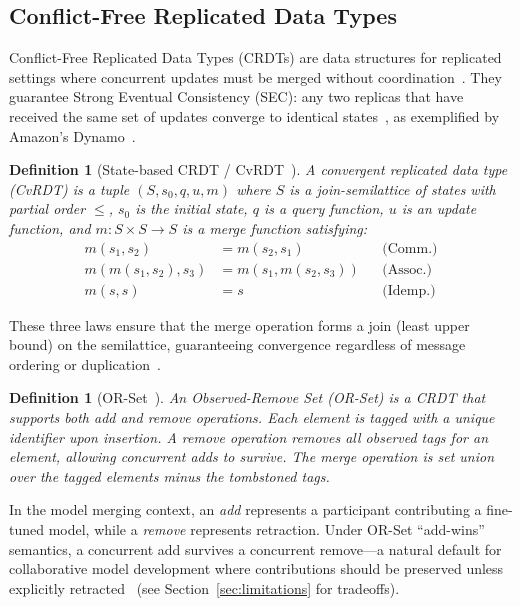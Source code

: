 \documentclass[10pt,letterpaper]{article}
\newtheorem{definition}[theorem]{Definition}
\begin{document}
\subsection{Conflict-Free Replicated Data Types}\label{sec:crdt_bg}

Conflict-Free Replicated Data Types (CRDTs) are data structures for replicated settings where concurrent updates must be merged without coordination~\cite{shapiro2011conflict,shapiro2011comprehensive}.
They guarantee Strong Eventual Consistency (SEC): any two replicas that have received the same set of updates converge to identical states~\cite{vogels2009eventually}, as exemplified by Amazon's Dynamo~\cite{decandia2007dynamo}.

\begin{definition}[State-based CRDT / CvRDT~\cite{shapiro2011conflict}]
A convergent replicated data type (CvRDT) is a tuple $(S, s_0, q, u, m)$ where $S$ is a join-semilattice of states with partial order $\leq$, $s_0$ is the initial state, $q$ is a query function, $u$ is an update function, and $m : S \times S \to S$ is a merge function satisfying:
\begin{align}
m(s_1, s_2) &= m(s_2, s_1) & &\text{(Comm.)} \label{eq:comm}\\
m(m(s_1, s_2), s_3) &= m(s_1, m(s_2, s_3)) & &\text{(Assoc.)} \label{eq:assoc}\\
m(s, s) &= s & &\text{(Idemp.)} \label{eq:idemp}
\end{align}
\end{definition}
These three laws ensure that the merge operation forms a join (least upper bound) on the semilattice, guaranteeing convergence regardless of message ordering or duplication~\cite{shapiro2011comprehensive, preguica2018conflict}.

\begin{definition}[OR-Set~\cite{shapiro2011conflict}]
An Observed-Remove Set (OR-Set) is a CRDT that supports both add and remove operations. Each element is tagged with a unique identifier upon insertion. A remove operation removes all observed tags for an element, allowing concurrent adds to survive. The merge operation is set union over the tagged elements minus the tombstoned tags.
\end{definition}
In the model merging context, an \emph{add} represents a participant contributing a fine-tuned model, while a \emph{remove} represents retraction.
Under OR-Set ``add-wins'' semantics, a concurrent add survives a concurrent remove---a natural default for collaborative model development where contributions should be preserved unless explicitly retracted~\cite{shapiro2011comprehensive} (see Section~\ref{sec:limitations} for tradeoffs).
\end{document}
